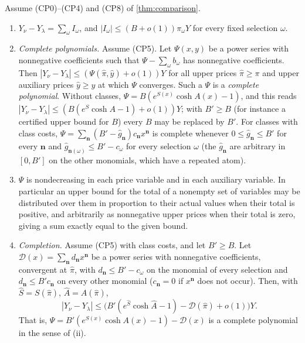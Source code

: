 \begin{lemma}
\label{lem:record:record-expansion}
Assume (CP0)--(CP4) and (CP8) of \cref{thm:comparison}.
\begin{enumerate}[label=(\roman*)]
\item $Y_\nu-Y_\lambda=\sum_\omega I_\omega$, and $|I_\omega|\le(B+o(1))\pi_\omega Y$
 for every fixed selection $\omega$.
\item \emph{Complete polynomials.} Assume (CP5). Let $\Psi(x,y)$ be a power
 series with nonnegative coefficients such that $\Psi-\sum_\omega b_\omega$ has
 nonnegative coefficients. Then $|Y_\nu-Y_\lambda|\le(\Psi(\hat\pi,\hat
 y)+o(1))Y$ for all upper prices $\hat\pi\ge\pi$ and upper auxiliary prices
 $\hat y\ge y$ at which $\Psi$ converges. Such a $\Psi$ is a \emph{complete
 polynomial}. Without classes, $\Psi=B(e^{S(x)}\cosh A(x)-1)$, and this
 reads $|Y_\nu-Y_\lambda|\le(B(e^S\cosh A-1)+o(1))Y$; with $B'\ge B$ (for
 instance a certified upper bound for $B$) every $B$ may be replaced by
 $B'$. For classes with class costs, $\Psi=\sum_{\boldsymbol n}(B'-\hat
 g_{\boldsymbol n})c_{\boldsymbol n}x^{\boldsymbol n}$ is complete whenever
 $0\le\hat g_{\boldsymbol n}\le B'$ for every $\boldsymbol n$ and $\hat
 g_{\boldsymbol n(\omega)}\le B'-c_\omega$ for every selection $\omega$ (the
 $\hat g_{\boldsymbol n}$ are arbitrary in $[0,B']$ on the other monomials,
 which have a repeated atom).
\item $\Psi$ is nondecreasing in each price variable and in each auxiliary
 variable. In particular an upper bound for the total of a nonempty set of variables
 may be distributed over them in proportion to their actual values when
 their total is positive, and arbitrarily as nonnegative upper prices when
 their total is zero, giving a sum exactly equal to the given bound.
\item \emph{Completion.} Assume (CP5) with class costs, and let $B'\ge B$. Let
 $\mathcal D(x)=\sum_{\boldsymbol n}d_{\boldsymbol n}x^{\boldsymbol n}$ be a power
 series with nonnegative coefficients, convergent at $\hat\pi$, with
 $d_{\boldsymbol n}\le B'-c_\omega$ on the monomial of every selection and
 $d_{\boldsymbol n}\le B'c_{\boldsymbol n}$ on every other monomial
 ($c_{\boldsymbol n}=0$ if $x^{\boldsymbol n}$ does not occur). Then, with
 $\hat S=S(\hat\pi)$, $\hat A=A(\hat\pi)$,
 \[
  |Y_\nu-Y_\lambda|\le\bigl(B'(e^{\hat S}\cosh\hat A-1)-\mathcal D(\hat\pi)
  +o(1)\bigr)Y .
 \]
 That is, $\Psi=B'(e^{S(x)}\cosh A(x)-1)-\mathcal D(x)$ is a complete
 polynomial in the sense of (ii).

\end{enumerate}
\end{lemma}
